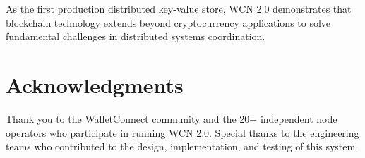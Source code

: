 \documentclass[10pt,twocolumn]{article}
\begin{document}
As the first production distributed key-value store, WCN 2.0 demonstrates that blockchain technology extends beyond cryptocurrency applications to solve fundamental challenges in distributed systems coordination.

\section*{Acknowledgments}

Thank you to the WalletConnect community and the 20+ independent node operators who participate in running WCN 2.0. Special thanks to the engineering teams who contributed to the design, implementation, and testing of this system.



\end{document}
